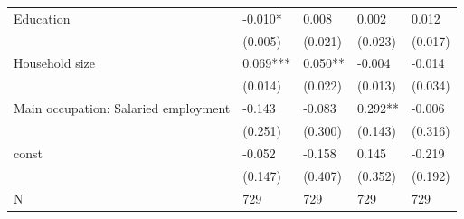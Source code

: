 \begin{tabular}{lllll}
Education                            &               -0.010* &       0.008 &              0.002 &      0.012 \\
                                     &               (0.005) &     (0.021) &            (0.023) &    (0.017) \\
Household size                       &              0.069*** &     0.050** &             -0.004 &     -0.014 \\
                                     &               (0.014) &     (0.022) &            (0.013) &    (0.034) \\
Main occupation: Salaried employment &                -0.143 &      -0.083 &            0.292** &     -0.006 \\
                                     &               (0.251) &     (0.300) &            (0.143) &    (0.316) \\
const                                &                -0.052 &      -0.158 &              0.145 &     -0.219 \\
                                     &               (0.147) &     (0.407) &            (0.352) &    (0.192) \\
N                                    &                   729 &         729 &                729 &        729 \\
\bottomrule
\end{tabular}
